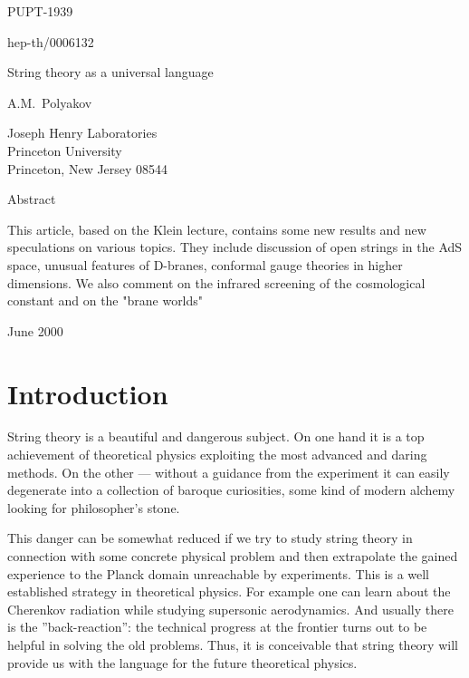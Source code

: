 \documentclass[a4paper,12pt]{article}
\begin{document}
\begin{titlepage}
\begin{flushright}
PUPT-1939

hep-th/0006132
\end{flushright}

\vspace{7 mm}

\begin{center}
{\huge String theory as a universal language}
\end{center}
\vspace{10 mm}
\begin{center}
{\large  

A.M.~Polyakov\\
}
\vspace{3mm}
Joseph Henry Laboratories\\
Princeton University\\
Princeton, New Jersey 08544
\end{center}
\vspace{7mm}
\begin{center}
{\large Abstract}
\end{center}
\noindent This article, based on the Klein lecture, contains some new results and new speculations on various topics. They include discussion of  open strings in the AdS space, unusual features of D-branes,
conformal gauge theories in higher dimensions. We also comment on the infrared screening of the  cosmological constant
and on the "brane worlds"
\vspace{7mm}
\begin{flushleft}
June 2000

\end{flushleft}
\end{titlepage}
%

\section{\protect\bigskip Introduction}

String theory is a beautiful and dangerous subject. On one hand it is a top
achievement of theoretical physics exploiting the most advanced and daring
methods. On the other --- without a guidance from the experiment it can easily
degenerate into a collection of baroque curiosities, some kind of modern
alchemy looking for philosopher's stone.

This danger can be somewhat reduced if we try to study string theory in
connection with some concrete physical problem and then extrapolate the
gained experience to the Planck domain unreachable by experiments. This is a
well established strategy in theoretical physics. For example one can learn
about the Cherenkov radiation while studying supersonic aerodynamics. And
usually there is the ''back-reaction'': the technical progress at the
frontier turns out to be helpful in solving the old problems. Thus, it is
conceivable that string theory will provide us with the language for the
future theoretical physics.
\end{document}
